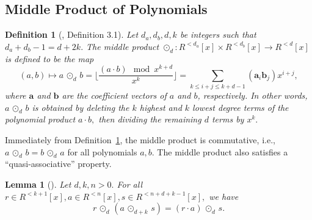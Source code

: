 \documentclass[11pt]{article}
\newcommand{\poly}[2]{{#1}^{<#2}[x]}
\newcommand{\middleProduct}[1]{\, \odot_{#1} \,}
\newtheorem{lemma}{Lemma}[section]
\newtheorem{definition}{Definition}[section]
\begin{document}
\subsection{Middle Product of Polynomials \cite{MPLWE}}
\begin{definition}[\cite{MPLWE}, Definition 3.1] \label{def:MP}
Let $d_a, d_b, d, k$ be integers such that $d_a + d_b -1 = d+2k.$ The middle product $\odot_d: \poly{R}{d_a} \times \poly{R}{d_b} \to \poly{R}{d} $ is defined to be the map
$$(a,b) \mapsto a \middleProduct{d} b = \lfloor \frac{(a\cdot b) \!\mod x^{k+d} }{x^k} \rfloor = \sum_{k\leq i+j\leq k+d-1} (\textbf{a}_i \textbf{b}_j) x^{i+j},$$
where $\textbf{a}$ and $\textbf{b}$ are the coefficient vectors of $a$ and $b$, respectively. In other words, $a \middleProduct{d} b$ is obtained by deleting the $k$ highest and $k$ lowest degree terms of the polynomial product $a\cdot b,$ then dividing the remaining $d$ terms by $x^k.$
\end{definition}
Immediately from Definition~\ref{def:MP}, the middle product is commutative, i.e., $a \middleProduct{d} b = b\middleProduct{d} a$ for all polynomials $a,b.$ The middle product also satisfies a ``quasi-associative'' property.
\begin{lemma}[\cite{MPLWE}] \label{lemma:mpAssoc} 
Let $d, k, n > 0.$ For all $r \in \poly{R}{k+1}, a \in \poly{R}{n}, s \in \poly{R}{n+d+k-1},$ we have 
$$r \middleProduct{d} (a \middleProduct{d+k} s ) = (r \cdot a) \middleProduct{d} s.$$ 
\end{lemma}
\end{document}
